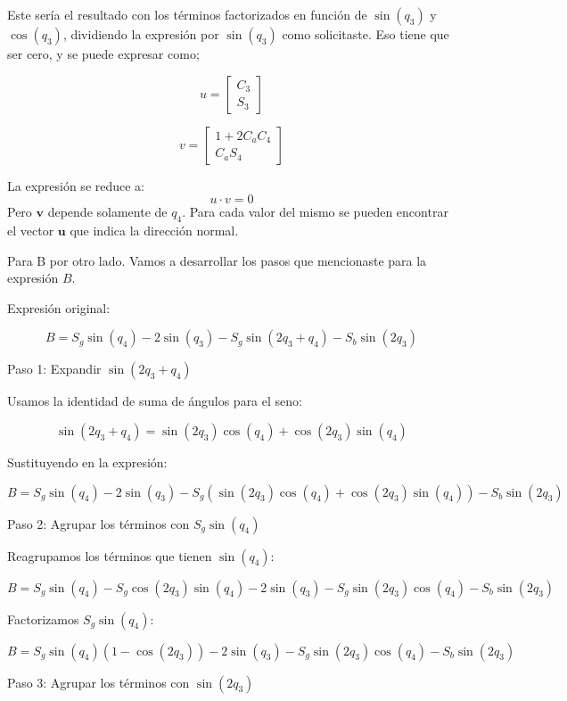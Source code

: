 \documentclass[a4paper,12pt]{article}
\begin{document}
Este sería el resultado con los términos factorizados en función de \(\sin(q_3)\) y \(\cos(q_3)\), dividiendo la expresión por \(\sin(q_3)\) como solicitaste.
Eso tiene que ser cero, y se puede expresar como;

\begin{equation}
    u =
    \begin{bmatrix}
        C_3\\
        S_3
    \end{bmatrix}
\end{equation}

\begin{equation}
    v =
    \begin{bmatrix}
        1 + 2C_aC_4\\
        C_aS_4
    \end{bmatrix}
\end{equation}

La expresión se reduce a:
\[u \cdot v = 0\]
Pero $\mathbf{v}$ depende solamente de $q_4$. Para cada valor del mismo
se pueden encontrar el vector $\mathbf{u}$ que indica la dirección normal.

Para B por otro lado.
Vamos a desarrollar los pasos que mencionaste para la expresión \( B \).

 Expresión original:

\[
B = S_g \sin(q_4) - 2\sin(q_3) - S_g \sin(2q_3 + q_4) - S_b \sin(2q_3)
\]

 Paso 1: Expandir \(\sin(2q_3 + q_4)\)

Usamos la identidad de suma de ángulos para el seno:

\[
\sin(2q_3 + q_4) = \sin(2q_3)\cos(q_4) + \cos(2q_3)\sin(q_4)
\]

Sustituyendo en la expresión:

\[
B = S_g \sin(q_4) - 2\sin(q_3) - S_g (\sin(2q_3)\cos(q_4) + \cos(2q_3)\sin(q_4)) - S_b \sin(2q_3)
\]

 Paso 2: Agrupar los términos con \( S_g \sin(q_4) \)

Reagrupamos los términos que tienen \( \sin(q_4) \):

\[
B = S_g \sin(q_4) - S_g \cos(2q_3)\sin(q_4) - 2\sin(q_3) - S_g \sin(2q_3)\cos(q_4) - S_b \sin(2q_3)
\]

Factorizamos \( S_g \sin(q_4) \):

\[
B = S_g \sin(q_4)(1 - \cos(2q_3)) - 2\sin(q_3) - S_g \sin(2q_3)\cos(q_4) - S_b \sin(2q_3)
\]

 Paso 3: Agrupar los términos con \( \sin(2q_3) \)
\end{document}
